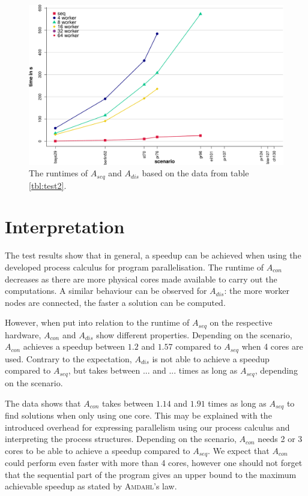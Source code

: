 \begin{figure}[h!]
  \centering
  \includegraphics[width=\textwidth]{img/test_distributed.pdf}
  \caption{The runtimes of $A_{seq}$ and $A_{dis}$ based on the data from table \ref{tbl:test2}.}
  \label{fig:test2}
\end{figure}

\clearpage
\section{Interpretation}
The test results show that in general, a speedup can be achieved when using the developed process calculus for program parallelisation. The runtime of $A_{con}$ decreases as there are more physical cores made available to carry out the computations. A similar behaviour can be observed for $A_{dis}$: the more worker nodes are connected, the faster a solution can be computed.

However, when put into relation to the runtime of $A_{seq}$ on the respective hardware, $A_{con}$ and $A_{dis}$ show different properties. Depending on the scenario, $A_{con}$ achieves a speedup between $1.2$ and $1.57$ compared to $A_{seq}$ when 4 cores are used. Contrary to the expectation, $A_{dis}$ is not able to achieve a speedup compared to $A_{seq}$, but takes between ... and ... times as long as $A_{seq}$, depending on the scenario.

The data shows that $A_{con}$ takes between $1.14$ and $1.91$ times as long as $A_{seq}$ to find solutions when only using one core. This may be explained with the introduced overhead for expressing parallelism using our process calculus and interpreting the process structures. Depending on the scenario, $A_{con}$ needs 2 or 3 cores to be able to achieve a speedup compared to $A_{seq}$. We expect that $A_{con}$ could perform even faster with more than 4 cores, however one should not forget that the sequential part of the program gives an upper bound to the maximum achievable speedup as stated by \textsc{Amdahl}'s law.

